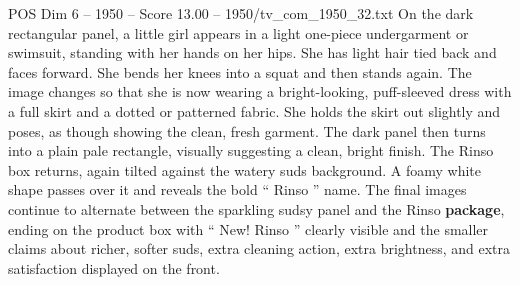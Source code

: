 \begin{textsample}{POS Dim 6 – 1950 – Score 13.00 – 1950/tv\_com\_1950\_32.txt}
On the dark rectangular panel, a little girl appears in a light one-piece undergarment or swimsuit, standing with her hands on her hips.
She has light hair tied back and faces forward.
She bends her knees into a squat and then stands again.
The image changes so that she is now wearing a bright-looking, puff-sleeved dress with a full skirt and a dotted or patterned fabric.
She holds the skirt out slightly and poses, as though showing the clean, fresh garment.
The dark panel then turns into a plain pale rectangle, visually suggesting a clean, bright finish.
The Rinso box returns, again tilted against the watery suds background.
A foamy white shape passes over it and reveals the bold “ Rinso ” name.
The final images continue to alternate between the sparkling sudsy panel and the Rinso \textbf{package}, ending on the product box with “ New!
Rinso ” clearly visible and the smaller claims about richer, softer suds, extra cleaning action, extra brightness, and extra satisfaction displayed on the front.

\end{textsample}
